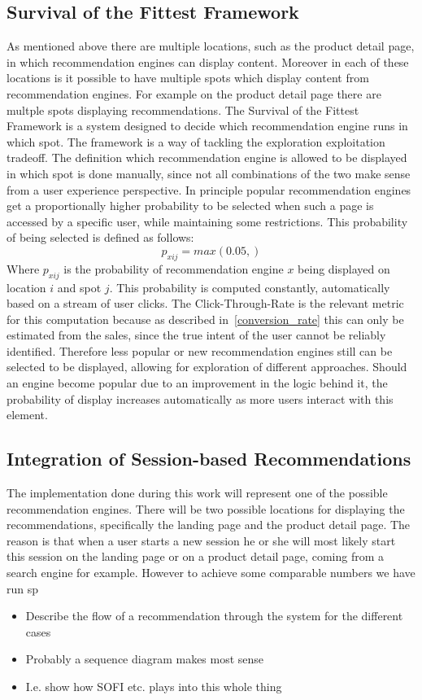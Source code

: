 \subsection{Survival of the Fittest Framework}
As mentioned above there are multiple locations, such as the product detail page, in which recommendation engines can display content.
Moreover in each of these locations is it possible to have multiple spots which display content from recommendation engines.
For example on the product detail page there are multple spots displaying recommendations.
The Survival of the Fittest Framework is a system designed to decide which recommendation engine runs in which spot. 
The framework is a way of tackling the exploration exploitation tradeoff.
The definition which recommendation engine is allowed to be displayed in which spot is done manually, since not all combinations of the two make sense from a user experience perspective.
In principle popular recommendation engines get a proportionally higher probability to be selected when such a page is accessed by a specific user, while maintaining some restrictions.
This probability of being selected is defined as follows:
\[
    p_{xij} = max(0.05, )
\]
Where $p_{xij}$ is the probability of recommendation engine $x$ being displayed on location $i$ and spot $j$.
This probability is computed constantly, automatically based on a stream of user clicks.
The Click-Through-Rate is the relevant metric for this computation because as described in~\ref{conversion_rate} this can only be estimated from the sales, since the true intent of the user cannot be reliably identified.
Therefore less popular or new recommendation engines still can be selected to be displayed, allowing for exploration of different approaches.
Should an engine become popular due to an improvement in the logic behind it, the probability of display increases automatically as more users interact with this element.

\subsection{Integration of Session-based Recommendations}
The implementation done during this work will represent one of the possible recommendation engines.
There will be two possible locations for displaying the recommendations, specifically the landing page and the product detail page.
The reason is that when a user starts a new session he or she will most likely start this session on the landing page or on a product detail page, coming from a search engine for example.
However to achieve some comparable numbers we have run sp
\begin{itemize}
    \item Describe the flow of a recommendation through the system for the different cases
    \item Probably a sequence diagram makes most sense
    \item I.e. show how SOFI etc. plays into this whole thing
\end{itemize}
